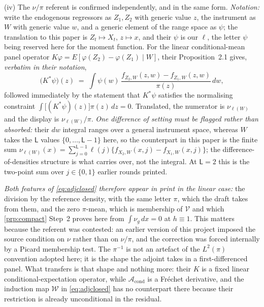 \begin{remark}
(iv) The $\nu/\pi$ referent is confirmed independently, and in the same form. \emph{Notation:}
\citet{feve2014} write the endogenous regressors as $Z_1,Z_2$ with generic value $z$, the instrument as
$W$ with generic value $w$, and a generic element of the range space as $\psi$; the translation to this
paper is $Z_t\mapsto X_t$, $z\mapsto x$, and their $\psi$ is our $\ell$, the letter $\psi$ being reserved
here for the moment function. For the linear conditional-mean panel operator
$K\varphi=E[\varphi(Z_2)-\varphi(Z_1)\mid W]$, their Proposition~2.1 gives, \emph{verbatim in their
notation},
\[
\big(K^{\ast}\psi\big)(z)\;=\;\int\psi(w)\,\frac{f_{Z_2,W}(z,w)-f_{Z_1,W}(z,w)}{\pi(z)}\,dw ,
\]
followed immediately by the statement that $K^{\ast}\psi$ satisfies the normalising constraint
$\int\big[(K^{\ast}\psi)(z)\big]\pi(z)\,dz=0$. Translated, the numerator is $\nu_{\ell(W)}$ and the
display is $\nu_{\ell(W)}/\pi$. \emph{One difference of setting must be flagged rather than absorbed:}
their $dw$ integral ranges over a general instrument space, whereas $W$ takes the $\mathsf L$ values
$\{0,\dots,\mathsf L-1\}$ here, so the
counterpart in this paper is the finite sum
$\nu_{\ell(W)}(x)=\sum_{j=0}^{\mathsf L-1}\ell(j)\{f_{X_2,W}(x,j)-f_{X_1,W}(x,j)\}$; the difference-of-densities
structure is what carries over, not the integral. At $\mathsf L=2$ this is the two-point sum over
$j\in\{0,1\}$ earlier rounds printed.

\emph{Both features of \eqref{eq:adjclosed} therefore appear in print in the linear case:} the division
by the reference density, with the same letter $\pi$, which the draft takes from them, and the zero
$\pi$-mean, which is membership of $\mathcal V$ and which \cref{prp:compact} Step~2 proves here from
$\int\nu_g\,dx=0$ at $h\equiv1$. This matters because the referent was contested: an earlier version of
this project imposed the source condition on $\nu$ rather than on $\nu/\pi$, and the correction was
forced internally by a Picard membership test. The $\pi^{-1}$ is not an artefact of the
$L^{2}(\pi)$ convention adopted here; it is the shape the adjoint takes in a first-differenced panel.
What transfers is that shape and nothing more: their $K$ is a fixed linear conditional-expectation
operator, while $\mathcal A_{\mathrm{cond}}$ is a Fr\'echet derivative, and the induction map
$\mathcal W$ in \eqref{eq:adjclosed} has no counterpart there because their restriction is already
unconditional in the residual.
\end{remark}


